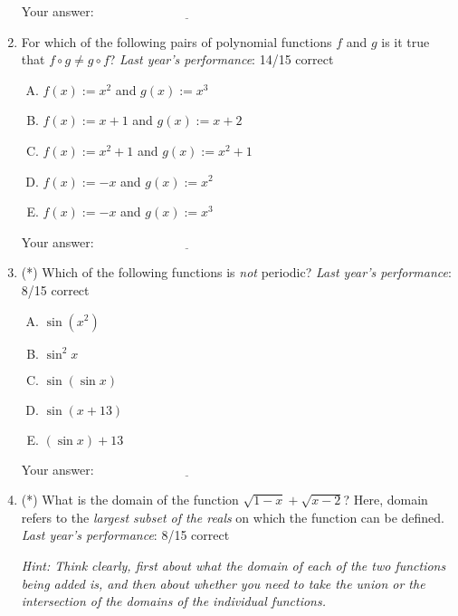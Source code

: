\documentclass[10pt]{amsart}
\begin{document}
\begin{enumerate}
  \vspace{0.1in}
  Your answer: $\underline{\qquad\qquad\qquad\qquad\qquad\qquad\qquad}$
  \vspace{1.5in}

\newpage
\item For which of the following pairs of polynomial functions $f$ and
  $g$ is it true that $f \circ g \ne g \circ f$? {\em Last year's
    performance}: 14/15 correct

  \begin{enumerate}[(A)]
  \item $f(x) := x^2$ and $g(x) := x^3$
  \item $f(x) := x + 1$ and $g(x) := x + 2$
  \item $f(x) := x^2 + 1$ and $g(x) := x^2 + 1$
  \item $f(x) := -x$ and $g(x) := x^2$
  \item $f(x) := -x$ and $g(x) := x^3$
  \end{enumerate}

  \vspace{0.1in}
  Your answer: $\underline{\qquad\qquad\qquad\qquad\qquad\qquad\qquad}$
  \vspace{1.5in}

\item (*) Which of the following functions is {\em not} periodic? {\em
    Last year's performance}: 8/15 correct

  \begin{enumerate}[(A)]
  \item $\sin(x^2)$
  \item $\sin^2x$
  \item $\sin(\sin x)$
  \item $\sin(x + 13)$
  \item $(\sin x) + 13$
  \end{enumerate}

  \vspace{0.1in}
  Your answer: $\underline{\qquad\qquad\qquad\qquad\qquad\qquad\qquad}$
  \vspace{1.5in}

\item (*) What is the domain of the function $\sqrt{1 - x} + \sqrt{x -
    2}$? Here, domain refers to the {\em largest subset of the reals}
  on which the function can be defined. {\em Last year's performance}:
  8/15 correct

  {\em Hint: Think clearly, first about what the domain of each of the
    two functions being added is, and then about whether you need to
    take the union or the intersection of the domains of the
    individual functions.}


\end{enumerate}
\end{document}
